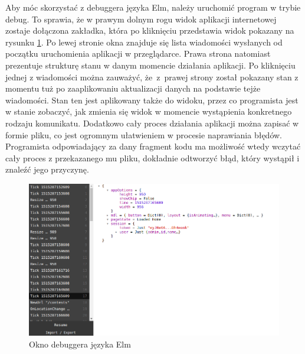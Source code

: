 Aby móc skorzystać z debuggera języka Elm, należy uruchomić program w trybie debug. To sprawia, że w prawym dolnym rogu widok aplikacji internetowej zostaje dołączona zakładka, która po kliknięciu przedstawia widok pokazany na rysunku \ref{fig:elmDebugger}. Po lewej stronie okna znajduje się lista wiadomości wysłanych od początku uruchomienia aplikacji w przeglądarce. Prawa strona natomiast prezentuje strukturę stanu w danym momencie działania aplikacji. Po kliknięciu jednej z wiadomości można zauważyć, że~z~prawej strony został pokazany stan z momentu tuż po zaaplikowaniu aktualizacji danych na podstawie tejże wiadomości. Stan ten jest aplikowany także do widoku, przez co programista jest w stanie zobaczyć, jak zmienia się widok w momencie wystąpienia konkretnego rodzaju komunikatu. Dodatkowo cały proces działania aplikacji można zapisać w formie pliku, co jest ogromnym ułatwieniem w procesie naprawiania błędów. Programista odpowiadający za dany fragment kodu ma możliwość wtedy wczytać cały proces z przekazanego mu pliku, dokładnie odtworzyć błąd, który wystąpił i znaleźć jego przyczynę.
\begin{figure}[h]
	\centering
	\includegraphics[width=\textwidth]{images/elm_debugger}
	\caption{Okno debuggera języka Elm}
	\label{fig:elmDebugger}
\end{figure}

